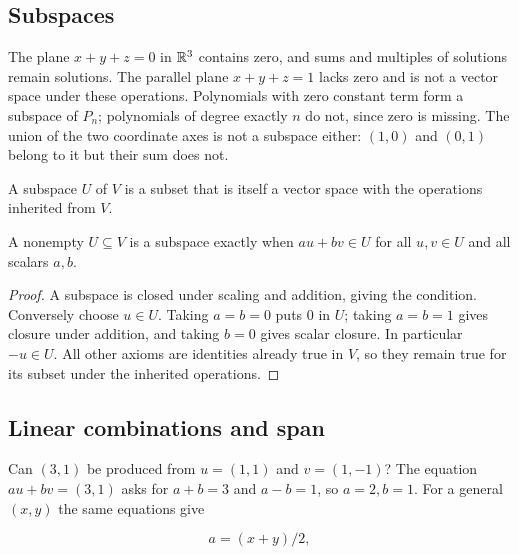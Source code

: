 \subsection{Subspaces}
The plane $x+y+z=0$ in $\mathbb{R}^3$ contains zero, and sums and multiples of
solutions remain solutions. The parallel plane $x+y+z=1$ lacks zero and
is not a vector space under these operations. Polynomials with zero
constant term form a subspace of $P_n$; polynomials of degree exactly $n$
do not, since zero is missing. The union of the two coordinate axes is
not a subspace either: $(1,0)$ and $(0,1)$ belong to it but their sum does not.
\begin{definition}[Subspace]
A subspace $U$ of $V$ is a subset that is itself a vector space with the
operations inherited from $V$.
\end{definition}
\begin{proposition}
A nonempty $U\subseteq V$ is a subspace exactly when
$au+bv\in U$ for all $u,v\in U$ and all scalars $a,b$.
\end{proposition}
\begin{proof}
A subspace is closed under scaling and addition, giving the condition.
Conversely choose $u\in U$. Taking $a=b=0$ puts $0$ in $U$; taking
$a=b=1$ gives closure under addition, and taking $b=0$ gives scalar
closure. In particular $-u\in U$. All other axioms are identities already
true in $V$, so they remain true for its subset under the inherited operations.
\end{proof}

\subsection{Linear combinations and span}
Can $(3,1)$ be produced from $u=(1,1)$ and $v=(1,-1)$? The equation
$au+bv=(3,1)$ asks for $a+b=3$ and $a-b=1$, so $a=2,b=1$.
For a general $(x,y)$ the same equations give

\[
a=(x+y)/2,
\]

